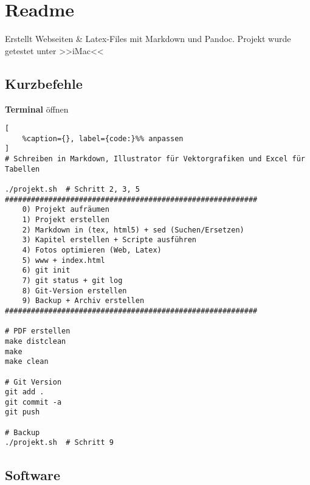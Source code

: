 \chapter{Readme}\label{readme}

Erstellt Webseiten \& Latex-Files mit Markdown und Pandoc. Projekt wurde
getestet unter >>iMac<<

\section{Kurzbefehle}\label{kurzbefehle}

\textbf{Terminal} öffnen

\lstset{language=Bash}%
\begin{lstlisting}[
	%caption={}, label={code:}%% anpassen
]
# Schreiben in Markdown, Illustrator für Vektorgrafiken und Excel für Tabellen

./projekt.sh  # Schritt 2, 3, 5
##########################################################
    0) Projekt aufräumen
    1) Projekt erstellen
    2) Markdown in (tex, html5) + sed (Suchen/Ersetzen)
    3) Kapitel erstellen + Scripte ausführen
    4) Fotos optimieren (Web, Latex)
    5) www + index.html
    6) git init
    7) git status + git log
    8) Git-Version erstellen
    9) Backup + Archiv erstellen
##########################################################

# PDF erstellen
make distclean
make
make clean

# Git Version
git add .
git commit -a
git push

# Backup
./projekt.sh  # Schritt 9
\end{lstlisting}

\section{Software}\label{software}

